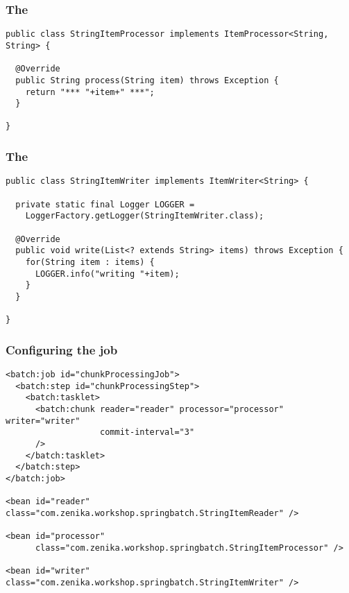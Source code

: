 \begin{frame}[fragile]
\frametitle{The }
\lstset{language=Java}
\begin{lstlisting}
public class StringItemProcessor implements ItemProcessor<String, String> {

  @Override
  public String process(String item) throws Exception {
    return "*** "+item+" ***";
  }

}
\end{lstlisting}
\end{frame}

\begin{frame}[fragile]
\frametitle{The }
\lstset{language=Java}
\begin{lstlisting}
public class StringItemWriter implements ItemWriter<String> {

  private static final Logger LOGGER =
    LoggerFactory.getLogger(StringItemWriter.class);

  @Override
  public void write(List<? extends String> items) throws Exception {
    for(String item : items) {
      LOGGER.info("writing "+item);
    }
  }

}
\end{lstlisting}
\end{frame}

\begin{frame}[fragile]
\frametitle{Configuring the job}
\lstset{language=XML}
\begin{lstlisting}
<batch:job id="chunkProcessingJob">
  <batch:step id="chunkProcessingStep">
    <batch:tasklet>
      <batch:chunk reader="reader" processor="processor" writer="writer"
                   commit-interval="3"
      />
    </batch:tasklet>
  </batch:step>
</batch:job>

<bean id="reader" class="com.zenika.workshop.springbatch.StringItemReader" />

<bean id="processor" 
      class="com.zenika.workshop.springbatch.StringItemProcessor" />

<bean id="writer" class="com.zenika.workshop.springbatch.StringItemWriter" />
\end{lstlisting}
\end{frame}

